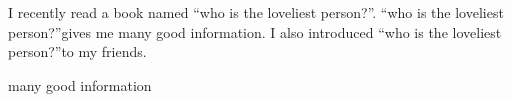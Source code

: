 \documentclass[12pt]{article}
\newcommand{\lovest}{``who is the loveliest person?''}
\newcommand{\good}{many good information}
\begin{document}
I recently read a book named ``who is the loveliest person?''. \lovest gives me \good . I also introduced \lovest to my friends.

\good  
\end{document}
